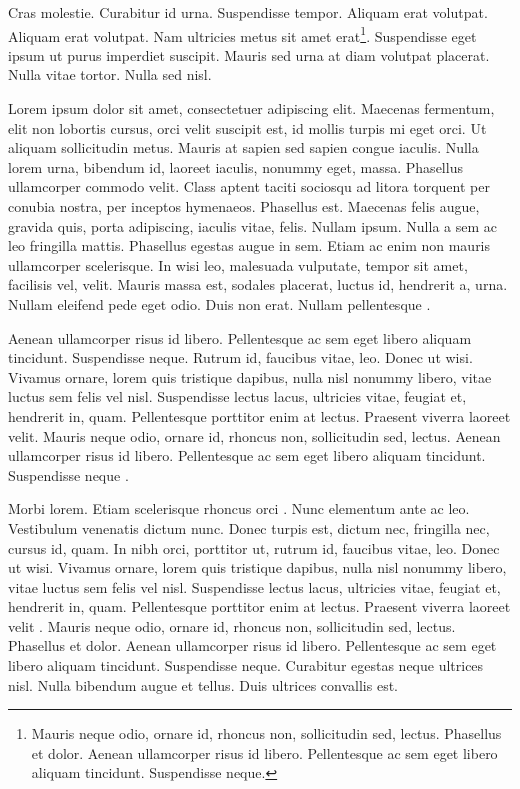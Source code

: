 Cras molestie. Curabitur id urna. Suspendisse tempor. Aliquam erat
volutpat. Aliquam erat volutpat. Nam ultricies metus sit amet
erat\footnote{Mauris neque odio, ornare id, rhoncus non, sollicitudin sed, lectus. Phasellus et dolor. Aenean ullamcorper risus id libero. Pellentesque ac sem eget libero aliquam tincidunt. Suspendisse neque.}.
Suspendisse eget ipsum ut purus imperdiet suscipit. Mauris sed urna at
diam volutpat placerat. Nulla vitae tortor. Nulla sed nisl.

Lorem ipsum dolor sit amet, consectetuer adipiscing elit. Maecenas
fermentum, elit non lobortis cursus, orci velit suscipit est, id mollis
turpis mi eget orci. Ut aliquam sollicitudin metus. Mauris at sapien sed
sapien congue iaculis. Nulla lorem urna, bibendum id, laoreet iaculis,
nonummy eget, massa. Phasellus ullamcorper commodo velit. Class aptent
taciti sociosqu ad litora torquent per conubia nostra, per inceptos
hymenaeos. Phasellus est. Maecenas felis augue, gravida quis, porta
adipiscing, iaculis vitae, felis. Nullam ipsum. Nulla a sem ac leo
fringilla mattis. Phasellus egestas augue in sem. Etiam ac enim non
mauris ullamcorper scelerisque. In wisi leo, malesuada vulputate, tempor
sit amet, facilisis vel, velit. Mauris massa est, sodales placerat,
luctus id, hendrerit a, urna. Nullam eleifend pede eget odio. Duis non
erat. Nullam pellentesque \autocite{Desfois1998}.

Aenean ullamcorper risus id libero. Pellentesque ac sem eget libero
aliquam tincidunt. Suspendisse neque. Rutrum id, faucibus vitae, leo.
Donec ut wisi. Vivamus ornare, lorem quis tristique dapibus, nulla nisl
nonummy libero, vitae luctus sem felis vel nisl. Suspendisse lectus
lacus, ultricies vitae, feugiat et, hendrerit in, quam. Pellentesque
porttitor enim at lectus. Praesent viverra laoreet velit. Mauris neque
odio, ornare id, rhoncus non, sollicitudin sed, lectus. Aenean
ullamcorper risus id libero. Pellentesque ac sem eget libero aliquam
tincidunt. Suspendisse neque \autocite{Georges1974}.

Morbi lorem. Etiam scelerisque rhoncus orci \autocite{Georges1974}. Nunc
elementum ante ac leo. Vestibulum venenatis dictum nunc. Donec turpis
est, dictum nec, fringilla nec, cursus id, quam. In nibh orci, porttitor
ut, rutrum id, faucibus vitae, leo. Donec ut wisi. Vivamus ornare, lorem
quis tristique dapibus, nulla nisl nonummy libero, vitae luctus sem
felis vel nisl. Suspendisse lectus lacus, ultricies vitae, feugiat et,
hendrerit in, quam. Pellentesque porttitor enim at lectus. Praesent
viverra laoreet velit \autocite{Desfois1998}. Mauris neque odio, ornare
id, rhoncus non, sollicitudin sed, lectus. Phasellus et dolor. Aenean
ullamcorper risus id libero. Pellentesque ac sem eget libero aliquam
tincidunt. Suspendisse neque. Curabitur egestas neque ultrices nisl.
Nulla bibendum augue et tellus. Duis ultrices convallis est.

